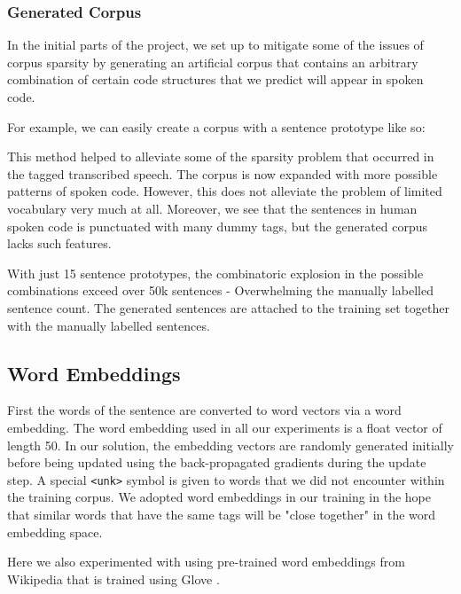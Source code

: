 \documentclass[fyp]{socreport}
\begin{document}

\subsubsection{Generated Corpus}
In the initial parts of the project, we set up to mitigate some of the issues
of corpus sparsity by generating an artificial corpus that contains an arbitrary
combination of certain code structures that we predict will appear in spoken code.

For example, we can easily create a corpus with a sentence prototype like so:

\hspace{20pt}
   

This method helped to alleviate some of the sparsity problem that occurred in
the tagged transcribed speech. The corpus is now expanded with more possible
patterns of spoken code. However, this does not alleviate the problem of limited
vocabulary very much at all. Moreover, we see that the sentences in human spoken
code is punctuated with many dummy tags, but the generated corpus lacks such
features.

With just 15 sentence prototypes, the combinatoric explosion in the possible
combinations exceed over 50k sentences - Overwhelming the manually labelled
sentence count. The generated sentences are attached to the training
set together with the manually labelled sentences.

\subsection{Word Embeddings}
First the words of the sentence are converted to word vectors via a word
embedding. The word embedding used in all our experiments is a float vector of
length 50. In our solution, the embedding vectors are randomly generated
initially before being updated using the back-propagated gradients during the
update step. A special \texttt{<unk>} symbol is given to words that we did not
encounter within the training corpus. We adopted word embeddings in our
training in the hope that similar words that have the same tags will be "close
together" in the word embedding space.

Here we also experimented with using pre-trained word embeddings from Wikipedia
that is trained using Glove \cite{pennington2014glove}.
\end{document}
